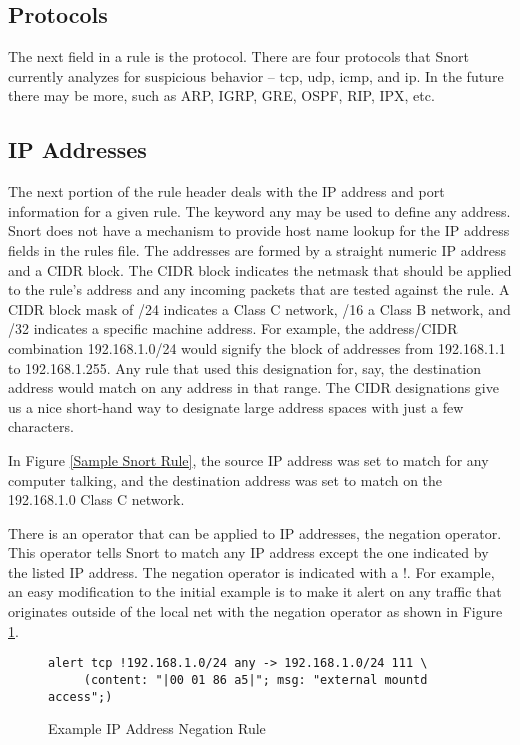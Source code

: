 \documentclass[english]{report}
\begin{document}
\subsection{Protocols}

The next field in a rule is the protocol. There are four protocols
that Snort currently analyzes for suspicious behavior -- tcp, udp,
icmp, and ip. In the future there may be more, such as ARP, IGRP,
GRE, OSPF, RIP, IPX, etc.


\subsection{IP Addresses}

The next portion of the rule header deals with the IP address and
port information for a given rule. The keyword any
may be used to define any address. Snort does not have a mechanism
to provide host name lookup for the IP address fields in the rules
file. The addresses are formed by a straight numeric IP address and
a CIDR\cite{cidrnotation} block. The CIDR block indicates the netmask
that should be applied to the rule's address and any incoming packets
that are tested against the rule. A CIDR block mask of /24 indicates
a Class C network, /16 a Class B network, and /32 indicates a specific
machine address. For example, the address/CIDR combination 192.168.1.0/24
would signify the block of addresses from 192.168.1.1 to 192.168.1.255.
Any rule that used this designation for, say, the destination address
would match on any address in that range. The CIDR designations give
us a nice short-hand way to designate large address spaces with just
a few characters.

In Figure \ref{Sample Snort Rule}, the source IP address was set
to match for any computer talking, and the destination address was
set to match on the 192.168.1.0 Class C network.

There is an operator that can be applied to IP addresses, the negation
operator. This operator tells Snort to match any IP address except
the one indicated by the listed IP address. The negation operator
is indicated with a !. For example, an easy modification
to the initial example is to make it alert on any traffic that originates
outside of the local net with the negation operator as shown in Figure
\ref{Example Negation}.

\begin{center}
\begin{figure}[!hbpt]
\begin{verbatim}
alert tcp !192.168.1.0/24 any -> 192.168.1.0/24 111 \
     (content: "|00 01 86 a5|"; msg: "external mountd access";)
\end{verbatim}

\caption{\label{Example Negation} Example IP Address Negation Rule}
\end{figure}
\end{center}
\end{document}
